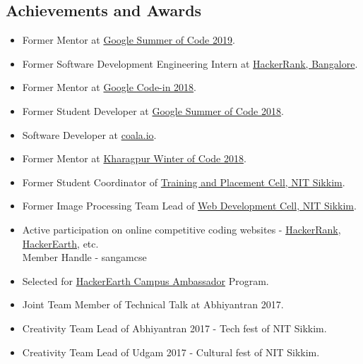 \documentclass[margin, centered]{res}
\begin{document}
\begin{resume}
    \section{Achievements and Awards}
    \begin{itemize}[leftmargin=*]
        \item Former Mentor at \href{https://summerofcode.withgoogle.com/}{Google Summer of Code 2019}.
        \item Former Software Development Engineering Intern at \href{https://www.hackerrank.com}{HackerRank, Bangalore}.
        \item Former Mentor at \href{https://codein.withgoogle.com}{Google Code-in 2018}.
        \item Former Student Developer at \href{https://summerofcode.withgoogle.com/}{Google Summer of Code 2018}.
        \item Software Developer at \href{https://coala.io}{coala.io}.
        \item Former Mentor at \href{https://kwoc.kossiitkgp.org/}{Kharagpur Winter of Code 2018}.
        \item Former Student Coordinator of \href{http://placement.nitsikkim.ac.in/}{Training and Placement Cell, NIT Sikkim}.
        \item Former Image Processing Team Lead of \href{https://nitsikkim.ac.in/webdevelopmentcell}{Web Development Cell, NIT Sikkim}.
        \item Active participation on online competitive coding websites - \href{https://www.hackerrank.com/sangamcse}{HackerRank},
              \href{https://www.hackerearth.com/@damonsangam}{HackerEarth}, etc. \\
              Member Handle - sangamcse
        \item Selected for \href{https://www.hackerearth.com/university}{HackerEarth Campus Ambassador} Program.
        \item Joint Team Member of Technical Talk at Abhiyantran 2017.
        \item Creativity Team Lead of Abhiyantran 2017 - Tech fest of NIT Sikkim.
        \item Creativity Team Lead of Udgam 2017 - Cultural fest of NIT Sikkim.
    \end{itemize}


\end{resume}
\end{document}
